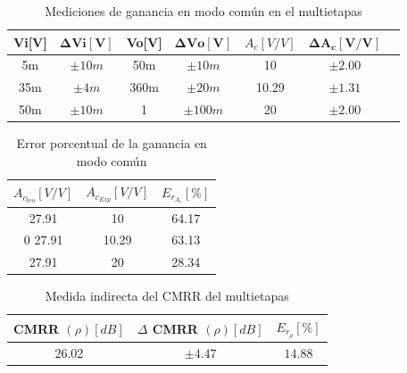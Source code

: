 \begin{enumerate}
        \begin{table}[H]
          \centering
          \begin{tabular}{|c|c|c|c|c|c|c|}
            \hline
            \textbf{Vi[V]} & $\mathbf{\Delta Vi[V]}$ & \textbf{Vo[V]} & $\mathbf{\Delta Vo[V]}$ & \textbf{$A_c[V/V]$} & $\mathbf{\Delta A_c[V/V]}$ \\ \hline
            5m             & $\pm 10m$               & 50m            & $\pm 10m$               & 10                  & $\pm 2.00$                 \\ \hline
            35m            & $\pm 4m$                & 360m           & $\pm 20m$               & 10.29               & $\pm 1.31$                 \\ \hline
            50m            & $\pm 10m$               & 1              & $\pm 100 m$             & 20                  & $\pm 2.00$                 \\ \hline
          \end{tabular}
          \caption{Mediciones de ganancia en modo común en el multietapas}
          \label{tab:ganancia_modocomun_multietapas}
        \end{table}

        \begin{table}[H]
          \centering
          \begin{tabular}{|c|c|c|}
            \hline
            $A_{c_{teo}} [V/V]$ & $A_{c_{Exp}} [V/V]$ & $E_{r_{A_c}} [\%]$ \\
            \hline
            27.91               & 10                  & 64.17              \\
            \hline0
            27.91               & 10.29               & 63.13              \\
            \hline
            27.91               & 20                  & 28.34              \\
            \hline
          \end{tabular}
          \caption{Error porcentual de la ganancia en modo común}
          \label{tab:error_porcentual_ganancia_comun}
        \end{table}

        \begin{table}[H]
          \centering
          \begin{tabular}{|c|c|c|}
            \hline
            CMRR $(\rho) [dB]$ & $\Delta$ CMRR $(\rho) [dB]$ & $E_{r_{\rho}} [\%]$ \\
            \hline
            26.02              & $\pm 4.47$                  & $14.88$             \\
            \hline
          \end{tabular}
          \caption{Medida indirecta del CMRR del multietapas}
          \label{tab:medida_indirecta_cmrr_me}
        \end{table}


\end{enumerate}
